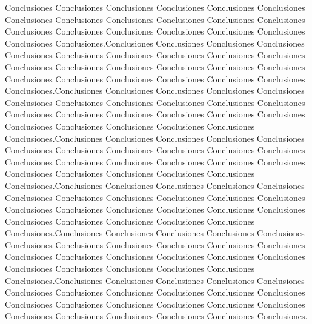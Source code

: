 Conclusiones Conclusiones Conclusiones Conclusiones Conclusiones Conclusiones Conclusiones Conclusiones Conclusiones Conclusiones Conclusiones Conclusiones Conclusiones Conclusiones Conclusiones Conclusiones Conclusiones Conclusiones Conclusiones Conclusiones.Conclusiones Conclusiones Conclusiones Conclusiones Conclusiones Conclusiones Conclusiones Conclusiones Conclusiones Conclusiones Conclusiones Conclusiones Conclusiones Conclusiones Conclusiones Conclusiones Conclusiones Conclusiones Conclusiones Conclusiones Conclusiones Conclusiones Conclusiones.Conclusiones Conclusiones Conclusiones Conclusiones Conclusiones Conclusiones Conclusiones Conclusiones Conclusiones Conclusiones Conclusiones Conclusiones Conclusiones Conclusiones Conclusiones Conclusiones Conclusiones Conclusiones Conclusiones Conclusiones Conclusiones Conclusiones Conclusiones.Conclusiones Conclusiones Conclusiones Conclusiones Conclusiones Conclusiones Conclusiones Conclusiones Conclusiones Conclusiones Conclusiones Conclusiones Conclusiones Conclusiones Conclusiones Conclusiones Conclusiones Conclusiones Conclusiones Conclusiones Conclusiones Conclusiones Conclusiones.Conclusiones Conclusiones Conclusiones Conclusiones Conclusiones Conclusiones Conclusiones Conclusiones Conclusiones Conclusiones Conclusiones Conclusiones Conclusiones Conclusiones Conclusiones Conclusiones Conclusiones Conclusiones Conclusiones Conclusiones Conclusiones Conclusiones Conclusiones.Conclusiones Conclusiones Conclusiones Conclusiones Conclusiones Conclusiones Conclusiones Conclusiones Conclusiones Conclusiones Conclusiones Conclusiones Conclusiones Conclusiones Conclusiones Conclusiones Conclusiones Conclusiones Conclusiones Conclusiones Conclusiones Conclusiones Conclusiones.Conclusiones Conclusiones Conclusiones Conclusiones Conclusiones Conclusiones Conclusiones Conclusiones Conclusiones Conclusiones Conclusiones Conclusiones Conclusiones Conclusiones Conclusiones Conclusiones Conclusiones Conclusiones Conclusiones Conclusiones Conclusiones Conclusiones Conclusiones.